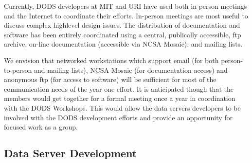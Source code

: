 Currently, DODS developers at MIT and URI have used both in-person meetings
and the Internet to coordinate their efforts. In-person meetings are most
useful to discuss complex highlevel design issues. The distribution of
documentation and software has been entirely coordinated using a central,
publically accessible, ftp archive, on-line documentation (accessible via
NCSA Mosaic), and mailing lists.

We envision that networked workstations which support email (for both
person-to-person and mailing lists), NCSA Mosaic (for documentation access)
and anonymous ftp (for access to software) will be sufficient for most of the
communication needs of the year one effort.  It is anticipated though
that the members would get together for a formal meeting once a year
in coordination with the DODS Workshops.  This would allow the data
servers developers to be involved with the DODS development efforts
and provide an opportunity for focused work as a group. 

\subsection{Data Server Development}

